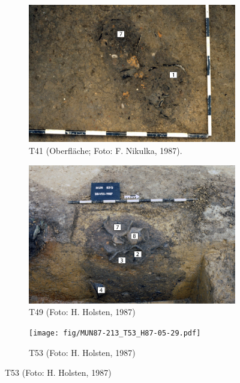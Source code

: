 \begin{figure}[p]
	\centering
	\begin{subfigure}[t]{\columnwidth}
		\includegraphics[width = \textwidth]{fig/MUN87-213_T41_F87-02-14.pdf}
		\caption{T41 (Oberfläche; Foto: F. Nikulka, 1987).}
		\label{fig:MUN87-213_T41_F87-02-14}
	\end{subfigure}\hfill
	\begin{subfigure}[t]{\columnwidth}
		\includegraphics[width = \textwidth]{fig/MUN87-213_T49_T49_H87-06-8.pdf}
		\caption{T49 (Foto: H. Holsten, 1987)}
		\label{fig:MUN87-213_T49_T49_H87-06-8}
	\end{subfigure}
	\begin{subfigure}[t]{\columnwidth}
		\texttt{[image: fig/MUN87-213\_T53\_H87-05-29.pdf]}
		\caption{T53 (Foto: H. Holsten, 1987)}
		\label{fig:MUN87-213_T53_H87-05-29}
	\end{subfigure}\hfill

\end{figure}
